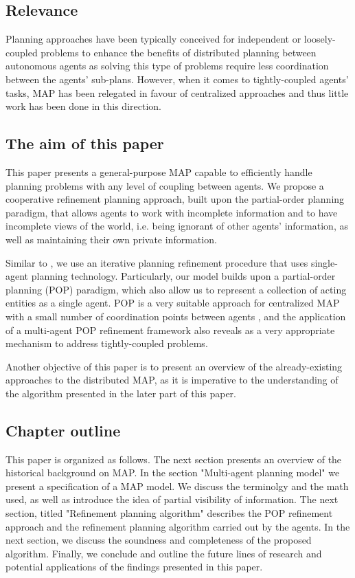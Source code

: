 \documentclass[12pt]{article}
\begin{document}
\subsection{Relevance}

Planning approaches have been typically conceived for independent or loosely-coupled problems to enhance the benefits of distributed planning between autonomous agents as solving this type of problems require less coordination between the agents' sub-plans.
However, when it comes to tightly-coupled agents' tasks, MAP has been relegated in favour of centralized approaches and thus little work has been done in this direction.

\subsection{The aim of this paper}

This paper presents a general-purpose MAP capable to efficiently handle planning problems with any level of coupling between agents.
We propose a cooperative refinement planning approach, built upon the partial-order planning paradigm, that allows agents to work with incomplete information and to have incomplete views of the world, i.e.
being ignorant of other agents' information, as well as maintaining their own private information.

Similar to \cite{Jonsson2011ScalingUM}, we use an iterative planning refinement procedure that uses single-agent planning technology.
Particularly, our model builds upon a partial-order planning (POP) paradigm, which also allow us to represent a collection of acting entities as a single agent.
POP is a very suitable approach for centralized MAP with a small number of coordination points between agents \cite{Kvarnstrm2010PlanningFL}, and the application of a multi-agent POP refinement framework also reveals as a very appropriate mechanism to address tightly-coupled problems.

Another objective of this paper is to present an overview of the already-existing approaches to the distributed MAP, as it is imperative to the understanding of the algorithm presented in the later part of this paper.

\subsection{Chapter outline}

This paper is organized as follows.
The next section presents an overview of the historical background on MAP.
In the section "Multi-agent planning model" we present a specification of a MAP model.
We discuss the terminolgy and the math used, as well as introduce the idea of partial visibility of information.
The next section, titled "Refinement planning algorithm" describes the POP refinement approach and the refinement planning algorithm carried out by the agents.
In the next section, we discuss the soundness and completeness of the proposed algorithm.
Finally, we conclude and outline the future lines of research and potential applications of the findings presented in this paper.
\end{document}
